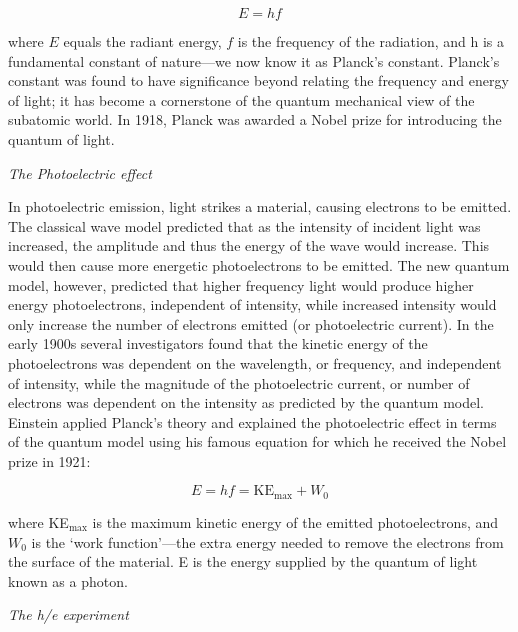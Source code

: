 \documentclass[11pt]{article}
\begin{document}
\begin{equation}
E = hf
\end{equation}

\noindent where $E$ equals the radiant energy, $f$ is the frequency of the
radiation, and h is a fundamental constant of nature---we now know it as
Planck's constant. Planck's constant was found to have significance
beyond relating the frequency and energy of light; it has become a cornerstone of
the quantum mechanical view of the subatomic world. In 1918, Planck was awarded
a Nobel prize for introducing the quantum of light.

\vspace{3mm}

\begin{center}
{\it The Photoelectric effect}
\end{center}

In photoelectric emission, light strikes a material, causing electrons to be
emitted. The classical wave model predicted that as the intensity of incident
light was increased, the amplitude and thus the energy of the wave would
increase. This would then cause more energetic photoelectrons to be emitted. The
new quantum model, however, predicted that higher frequency light would produce
higher energy photoelectrons, independent of intensity, while increased
intensity would only increase the number of electrons emitted (or photoelectric
current). In the early 1900s several investigators found that the kinetic energy
of the photoelectrons was dependent on the wavelength, or frequency, and
independent of intensity, while the magnitude of the photoelectric current, or
number of electrons was dependent on the intensity as predicted by the quantum
model. Einstein applied Planck's theory and explained the photoelectric effect
in terms of the quantum model using his famous equation for which he received
the Nobel prize in 1921:

\begin{equation}
E = hf = \textrm{KE}_\textrm{max} + W_0
\end{equation}

\noindent where KE$_\textrm{max}$ is the maximum kinetic energy of the emitted
photoelectrons, and $W_0$ is the `work function'---the extra energy needed to remove 
the electrons from the surface of the material. E is the energy supplied by the quantum 
of light known as a photon.

\vspace{3mm}

\begin{center}
{\it The h/e experiment}
\end{center}
\end{document}
